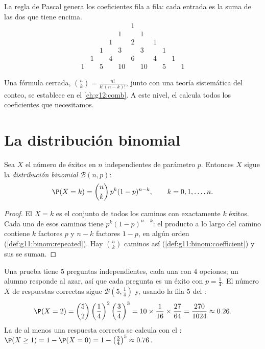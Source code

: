 La regla de Pascal genera los coeficientes fila a fila: cada entrada es la
suma de las dos que tiene encima.
\[
\begin{array}{ccccccccccc}
&&&&&1&&&&&\\
&&&&1&&1&&&&\\
&&&1&&2&&1&&&\\
&&1&&3&&3&&1&&\\
&1&&4&&6&&4&&1&\\
1&&5&&10&&10&&5&&1
\end{array}
\]

\begin{remark}
Una fórmula cerrada, $\binom nk = \frac{n!}{k!(n-k)!}$, junto con una
teoría sistemática del conteo, se establece en el \cref{ch:g12:comb}. A
este nivel, el  calcula todos los coeficientes que
necesitamos.
\end{remark}

\section{La distribución binomial}

\begin{theorem}\label{thm:g11:binom:binomial}
Sea $X$ el número de éxitos en $n$  independientes de
parámetro $p$. Entonces $X$ sigue la \emph{distribución
binomial} $\mathcal B(n, p)$:
\[
\P(X = k) = \binom{n}{k}\, p^k (1-p)^{n-k},
\qquad k = 0, 1, \dots, n .
\]
\end{theorem}

\begin{proof}
El  $X = k$ es el conjunto de todos los caminos con exactamente $k$
éxitos. Cada uno de esos caminos tiene  $p^k(1-p)^{n-k}$: el
producto a lo largo del camino contiene $k$ factores $p$ y $n - k$
factores $1-p$, en algún orden (\cref{def:g11:binom:repeated}). Hay
$\binom nk$ caminos así (\cref{def:g11:binom:coefficient}) y sus
 se suman.
\end{proof}

\begin{example}\label{ex:g11:binom:quiz}
Una prueba tiene $5$ preguntas independientes, cada una con $4$ opciones;
un alumno responde al azar, así que cada pregunta es un éxito con
$p = \frac14$. El número $X$ de respuestas correctas sigue
$\mathcal B\left(5, \frac14\right)$ y, usando la fila $5$ del :
\[
\P(X = 2) = \binom52 \left(\frac14\right)^2\left(\frac34\right)^3
= 10 \times \frac{1}{16} \times \frac{27}{64}
= \frac{270}{1024} \approx 0.26 .
\]
La  de al menos una respuesta correcta se calcula con el
:
$\P(X \geq 1) = 1 - \P(X = 0) = 1 - \left(\frac34\right)^5 \approx
0.76$.
\end{example}

